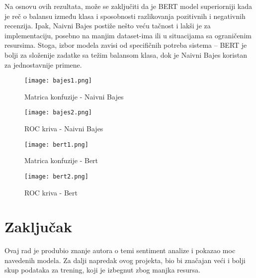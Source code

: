 \documentclass{article}
\begin{document}
Na osnovu ovih rezultata, može se zaključiti da je BERT model superiorniji kada je reč o balansu između klasa i sposobnosti razlikovanja pozitivnih i negativnih recenzija. Ipak, Naivni Bajes postiže nešto veću tačnost i lakši je za implementaciju, posebno na manjim dataset-ima ili u situacijama sa ograničenim resursima. Stoga, izbor modela zavisi od specifičnih potreba sistema – BERT je bolji za složenije zadatke sa težim balansom klasa, dok je Naivni Bajes koristan za jednostavnije primene.
\begin{figure}[h!]
    \centering
    \begin{minipage}{0.45\linewidth}
        \centering
        \texttt{[image: bajes1.png]}
        \caption{Matrica konfuzije - Naivni Bajes}
        \label{fig:bert}
    \end{minipage}
    \hfill
    \begin{minipage}{0.45\linewidth}
        \centering
        \texttt{[image: bajes2.png]}
        \caption{ROC kriva - Naivni Bajes}
        \label{fig:naive-bayes}
    \end{minipage}
\end{figure}
\begin{figure}[h!]
    \centering
    \begin{minipage}{0.45\linewidth}
        \centering
        \texttt{[image: bert1.png]}
        \caption{Matrica konfuzije - Bert}
        \label{fig:bert}
    \end{minipage}
    \hfill
    \begin{minipage}{0.45\linewidth}
        \centering
        \texttt{[image: bert2.png]}
        \caption{ROC kriva - Bert}
        \label{fig:naive-bayes}
    \end{minipage}
\end{figure}

\newpage
\newpage
\section{Zaključak}
Ovaj rad je produbio znanje autora o temi sentiment analize i pokazao moc navedenih modela. Za dalji napredak ovog projekta, bio bi značajan veći i bolji skup podataka za trening,
koji je izbegnut zbog manjka resursa.
\newpage
\end{document}
